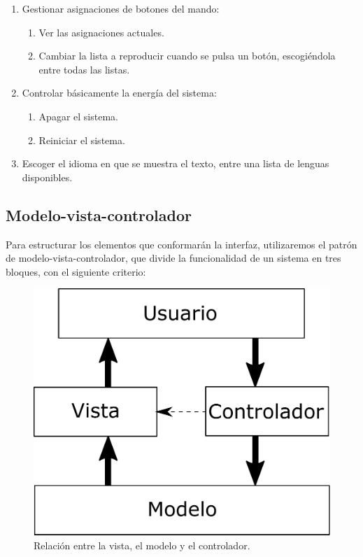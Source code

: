 \begin{enumerate}
	\item Gestionar asignaciones de botones del mando:
	
	\begin{enumerate}
		\item Ver las asignaciones actuales.
		\item Cambiar la lista a reproducir cuando se pulsa un botón, escogiéndola entre todas las listas.
	\end{enumerate}
	
	\item Controlar básicamente la energía del sistema:
	
	\begin{enumerate}
		\item Apagar el sistema.
		\item Reiniciar el sistema.
	\end{enumerate}
	
	\item Escoger el idioma en que se muestra el texto, entre una lista de lenguas disponibles.
\end{enumerate}

\subsection{Modelo-vista-controlador}

Para estructurar los elementos que conformarán la interfaz, utilizaremos el patrón de modelo-vista-controlador, que divide la funcionalidad de un sistema en tres bloques, con el siguiente criterio:

\smallskip

\begin{figure}[H]
	\noindent \begin{centering}
		\includegraphics[width=\linewidth/2]{capitulo4/mvc}
		\par\end{centering}
	\smallskip
	\caption{\label{fig:mvc} Relación entre la vista, el modelo y el controlador.}
\end{figure} 

